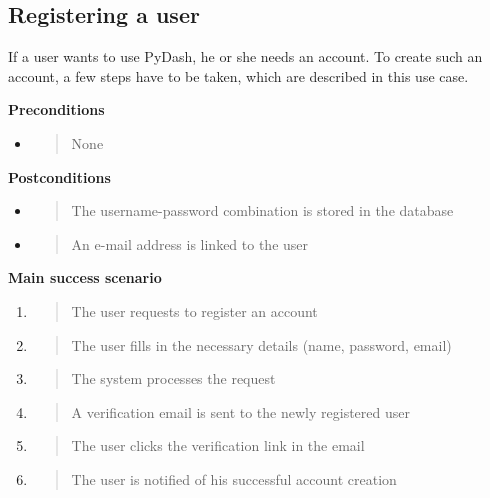 \hypertarget{registering-a-user}{%
\subsection{Registering a user}\label{registering-a-user}}

If a user wants to use PyDash, he or she needs an account. To create
such an account, a few steps have to be taken, which are described in
this use case.

\textbf{Preconditions}

\begin{itemize}
\item
  \begin{quote}
  None
  \end{quote}
\end{itemize}

\textbf{Postconditions}

\begin{itemize}
\item
  \begin{quote}
  The username-password combination is stored in the database
  \end{quote}
\item
  \begin{quote}
  An e-mail address is linked to the user
  \end{quote}
\end{itemize}

\textbf{Main success scenario}

\begin{enumerate}
\def\labelenumi{\arabic{enumi}.}
\item
  \begin{quote}
  The user requests to register an account
  \end{quote}
\item
  \begin{quote}
  The user fills in the necessary details (name, password, email)
  \end{quote}
\item
  \begin{quote}
  The system processes the request
  \end{quote}
\item
  \begin{quote}
  A verification email is sent to the newly registered user
  \end{quote}
\item
  \begin{quote}
  The user clicks the verification link in the email
  \end{quote}
\item
  \begin{quote}
  The user is notified of his successful account creation
  \end{quote}
\end{enumerate}

